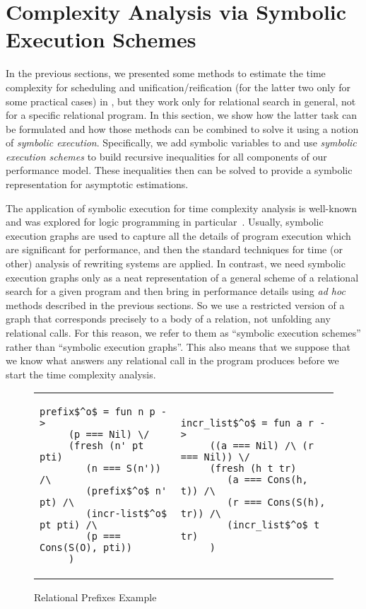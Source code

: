 \section{Complexity Analysis via Symbolic Execution Schemes}
\label{sec:symbolic}

In the previous sections, we presented some methods to estimate the time complexity for scheduling and unification/reification (for the latter two only for some practical cases) in \mK, but they work
only for relational search in general, not for a specific relational program. In this section, we show how the latter task can be formulated and how those methods can be combined to solve
it using a notion of \emph{symbolic execution}.
Specifically, we add symbolic variables to \mK and use \emph{symbolic execution schemes} to build recursive inequalities for all components of our performance model.
These inequalities then can be solved to provide a symbolic representation for asymptotic estimations.

The application of symbolic execution for time complexity analysis is well-known and was explored for logic programming in particular~\cite{SymbolicExecutionForAnalysis}.
Usually, symbolic execution graphs are used to capture all the details of program execution which are significant for performance, and then the standard techniques for time (or other)
analysis of rewriting systems are applied. In contrast, we need symbolic execution graphs only as a neat representation of a general scheme of a relational search for a
given program and then bring in performance details using \emph{ad hoc} methods described in the previous sections. So we use a restricted version of a graph that corresponds
precisely to a body of a relation, not unfolding any relational calls. For this reason, we refer to them as ``symbolic execution schemes'' rather than ``symbolic execution graphs''.
This also means that we suppose that we know what answers any relational call in the program produces before we start the time complexity analysis.

\begin{figure}[t]
\begin{tabular}{p{6cm}p{6cm}}
\begin{lstlisting}[basicstyle=\small]
   prefix$^o$ = fun n p ->
     (p === Nil) \/
     (fresh (n' pt pti)
        (n === S(n')) /\
        (prefix$^o$ n' pt) /\
        (incr-list$^o$ pt pti) /\
        (p === Cons(S(O), pti))
     )
\end{lstlisting} &
\begin{lstlisting}[basicstyle=\small]
   incr_list$^o$ = fun a r ->
     ((a === Nil) /\ (r === Nil)) \/
     (fresh (h t tr)
        (a === Cons(h, t)) /\
        (r === Cons(S(h), tr)) /\
        (incr_list$^o$ t tr)
     )
\end{lstlisting}
\end{tabular}

\caption{Relational Prefixes Example}
\label{fig:prefixo_definition}
\end{figure}

